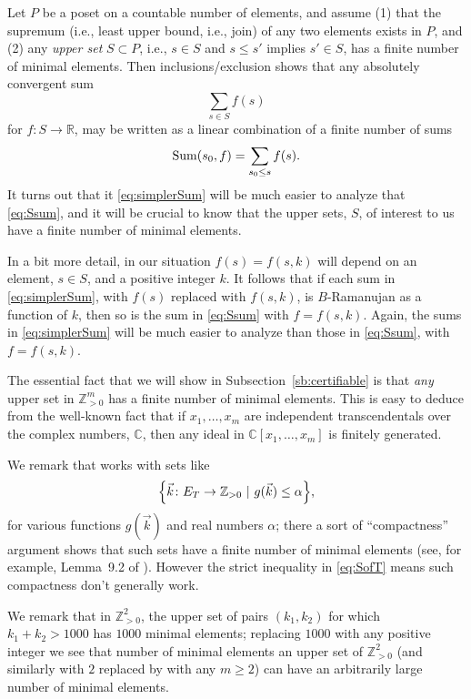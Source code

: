 \documentclass{memo-l}
\theoremstyle{plain}
\theoremstyle{definition}
\numberwithin{section}{chapter}
\numberwithin{equation}{chapter}
\newcommand{\reals}{{\mathbb R}}
\newcommand{\integers}{{\mathbb Z}}
\newcommand{\complex}{{\mathbb C}}
\newcommand{\from}{\colon}
\theoremstyle{plain}
\theoremstyle{definition}
\begin{document}
Let $P$ be a poset on a countable number of elements, and assume
(1) that the supremum (i.e., least upper bound, i.e., join) of any
two elements exists in $P$, and (2) any {\em upper set} $S\subset P$,
i.e., $s\in S$ and $s\le s'$
implies $s'\in S$, has a finite number of minimal elements.
Then 
inclusions/exclusion shows that any absolutely convergent sum
\begin{equation}\label{eq:Ssum}
\sum_{s\in S} f(s)
\end{equation}
for $f\from S\to\reals$, may be written as a linear combination of 
a finite number of sums
\begin{equation}\label{eq:simplerSum}
{\rm Sum}(s_0,f) = \sum_{s_0 \le s} f(s) .
\end{equation}
It turns out that it \eqref{eq:simplerSum} will be much easier to
analyze that \eqref{eq:Ssum}, and it will be crucial to know that
the upper sets, $S$, of interest to us have a
finite number of minimal elements.

In a bit more detail,
in our situation $f(s)=f(s,k)$ will depend on an element, $s\in S$,
and a positive integer $k$.  It follows that if each
sum in \eqref{eq:simplerSum}, with $f(s)$ replaced with $f(s,k)$,
is $B$-Ramanujan as a function of $k$, then so is the
sum in \eqref{eq:Ssum} with $f=f(s,k)$.
Again, the sums in \eqref{eq:simplerSum} will be much easier to
analyze than those in \eqref{eq:Ssum}, with $f=f(s,k)$.

The essential fact that we will show in
Subsection~\ref{sb:certifiable} is that {\em any} upper set 
in $\integers_{>0}^m$ has a finite number of minimal elements.
This is easy to deduce from the well-known fact that
if $x_1,\ldots,x_m$ are independent transcendentals over
the complex numbers, $\complex$, then any ideal in
$\complex[x_1,\ldots,x_m]$ is finitely generated.

We remark that
\cite{friedman_alon} works with sets like
\begin{equation}\label{eq:nonStrictInequality}
\Bigl\{ \vec k\from E_T\to \integers_{>0} \ |\
g(\vec k) \le \alpha
\Bigr\},
\end{equation}
for various functions $g(\vec k)$ and real numbers $\alpha$; there
a sort of ``compactness'' argument shows that such sets
have a finite number of minimal
elements (see, for example, Lemma~9.2 of \cite{friedman_alon}).
However the strict inequality in \eqref{eq:SofT} means such compactness
don't generally work.

We remark that in $\integers_{>0}^2$, the upper set of pairs
$(k_1,k_2)$ 
for which $k_1+k_2>1000$ has $1000$ minimal elements; replacing
$1000$ with any positive integer we see that number of minimal elements
an upper set of $\integers_{>0}^2$ (and similarly with $2$ replaced
by with any $m\ge 2$) can have an arbitrarily large number of 
minimal elements.
\end{document}
